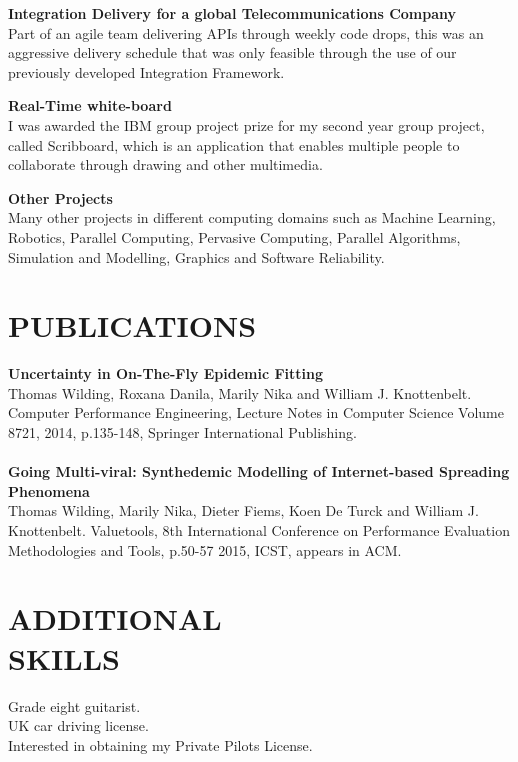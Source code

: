 \documentclass[margin, 10pt]{res} %
\begin{document}
\begin{resume}
\textbf{Integration Delivery for a global Telecommunications Company} \\
Part of an agile team delivering APIs through weekly code drops, this was an aggressive delivery schedule that was only feasible through the use of our previously developed Integration Framework.

\textbf{Real-Time white-board} \\
I was awarded the IBM group project prize for my second year group project, called Scribboard, which is an application that enables multiple people to collaborate through drawing and other multimedia.

\textbf{Other Projects} \\
Many other projects in different computing domains such as Machine Learning, Robotics, Parallel Computing, Pervasive Computing, Parallel Algorithms, Simulation and Modelling, Graphics and Software Reliability.

\section{PUBLICATIONS} 

\textbf{Uncertainty in On-The-Fly Epidemic Fitting}\\
Thomas Wilding, Roxana Danila, Marily Nika and William J. Knottenbelt. Computer Performance Engineering, Lecture Notes in Computer Science Volume 8721, 2014, p.135-148, Springer International Publishing. \\\\
\textbf{Going Multi-viral: Synthedemic Modelling of Internet-based Spreading Phenomena}\\
Thomas Wilding, Marily Nika, Dieter Fiems, Koen De Turck and William J. Knottenbelt. Valuetools, 8th International Conference on Performance Evaluation Methodologies and Tools, p.50-57 2015, ICST, appears in ACM.



\section{ADDITIONAL \\ SKILLS} 

Grade eight guitarist. \\
UK car driving license. \\
Interested in obtaining my Private Pilots License.\\


\end{resume}
\end{document}
